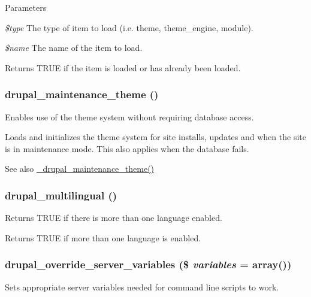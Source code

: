 \begin{DoxyParams}{Parameters}
\item[{\em \$type}]The type of item to load (i.e. theme, theme\_\-engine, module). \item[{\em \$name}]The name of the item to load.\end{DoxyParams}
\begin{DoxyReturn}{Returns}
TRUE if the item is loaded or has already been loaded. 
\end{DoxyReturn}
\hypertarget{bootstrap_8inc_a861d3f7c553fe62829f6c0f2e4fe89e6}{
\subsubsection[{drupal\_\-maintenance\_\-theme}]{\setlength{\rightskip}{0pt plus 5cm}drupal\_\-maintenance\_\-theme ()}}
\label{bootstrap_8inc_a861d3f7c553fe62829f6c0f2e4fe89e6}
Enables use of the theme system without requiring database access.

Loads and initializes the theme system for site installs, updates and when the site is in maintenance mode. This also applies when the database fails.

\begin{DoxySeeAlso}{See also}
\hyperlink{theme_8maintenance_8inc_a8f521a6aba04fc11935a874df3ad9f05}{\_\-drupal\_\-maintenance\_\-theme()} 
\end{DoxySeeAlso}
\hypertarget{bootstrap_8inc_ae1a2f0f465079ac3f1767b8c14553582}{
\subsubsection[{drupal\_\-multilingual}]{\setlength{\rightskip}{0pt plus 5cm}drupal\_\-multilingual ()}}
\label{bootstrap_8inc_ae1a2f0f465079ac3f1767b8c14553582}
Returns TRUE if there is more than one language enabled.

\begin{DoxyReturn}{Returns}
TRUE if more than one language is enabled. 
\end{DoxyReturn}
\hypertarget{bootstrap_8inc_ae40262dd353ec3d0fada2e2d2d44a8ef}{
\subsubsection[{drupal\_\-override\_\-server\_\-variables}]{\setlength{\rightskip}{0pt plus 5cm}drupal\_\-override\_\-server\_\-variables (\$ {\em variables} = {\ttfamily array()})}}
\label{bootstrap_8inc_ae40262dd353ec3d0fada2e2d2d44a8ef}
Sets appropriate server variables needed for command line scripts to work.

